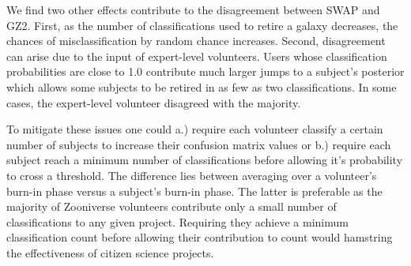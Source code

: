 \documentclass[twocolumn]{aastex6}
\newcommand{\Pf}{$P_{F,0}$}
\newcommand{\Pn}{$P_{N,0}$}
\newcommand{\feat}{`Featured'}
\newcommand{\notfeat}{`Not'}
\newcommand{\raw}{GZ2$_{\text{raw}}$}
\begin{document}
We find two other effects contribute to the disagreement between SWAP and GZ2. First, as the number of classifications used to retire a galaxy decreases, the chances of misclassification by random chance increases. 
Second, disagreement can arise due to the input of expert-level volunteers. Users whose classification probabilities are close to 1.0 contribute much larger jumps to a subject's posterior which allows some subjects to be retired in as few as two classifications. In some cases, the expert-level volunteer disagreed with the majority. 





To mitigate these issues one could a.) require each volunteer classify a certain 
number of subjects to increase their confusion matrix values or
b.) require each subject reach a minimum number of classifications before allowing 
it's probability to cross a threshold. The difference lies between averaging over a 
volunteer's burn-in phase versus a subject's burn-in phase.
The latter is preferable as the majority of Zooniverse volunteers contribute only 
a small number of classifications to any given project. Requiring they achieve a 
minimum classification count before allowing their contribution to count would 
hamstring the effectiveness of citizen science projects. 
\end{document}
